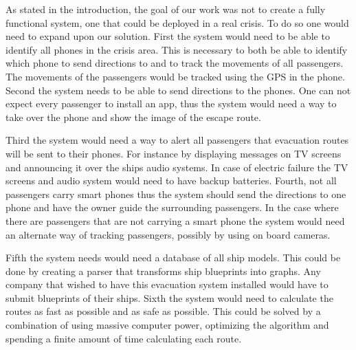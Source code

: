 As stated in the introduction, the goal of our work was not to create a fully functional system, one that could be deployed in a real crisis. To do so one would need to expand upon our solution. First the system would need to be able to identify all phones in the crisis area. This is necessary to both be able to identify which phone to send directions to and to track the movements of all passengers. The movements of the passengers would be tracked using the GPS in the phone. Second the system needs to be able to send directions to the phones. One can not expect every passenger to install an app, thus the system would need a way to take over the phone and show the image of the escape route. 

Third the system would need a way to alert all passengers that evacuation routes will be sent to their phones. For instance by displaying messages on TV screens and announcing it over the ships audio systems. In case of electric failure the TV screens and audio system would need to have backup batteries.  Fourth, not all passengers carry smart phones thus the system should send the directions to one phone and have the owner guide the surrounding passengers. In the case where there are passengers that are not carrying a smart phone the system would need an alternate way of tracking passengers, possibly by using on board cameras.

Fifth the system needs would need a database of all ship models. This could be done by creating a parser that transforms ship blueprints into graphs. Any company that wished to have this evacuation system installed would have to submit blueprints of their ships. Sixth the system would need to calculate the routes as fast as possible and as safe as possible. This could be solved by a combination of using massive computer power, optimizing the algorithm and spending a finite amount of time calculating each route.